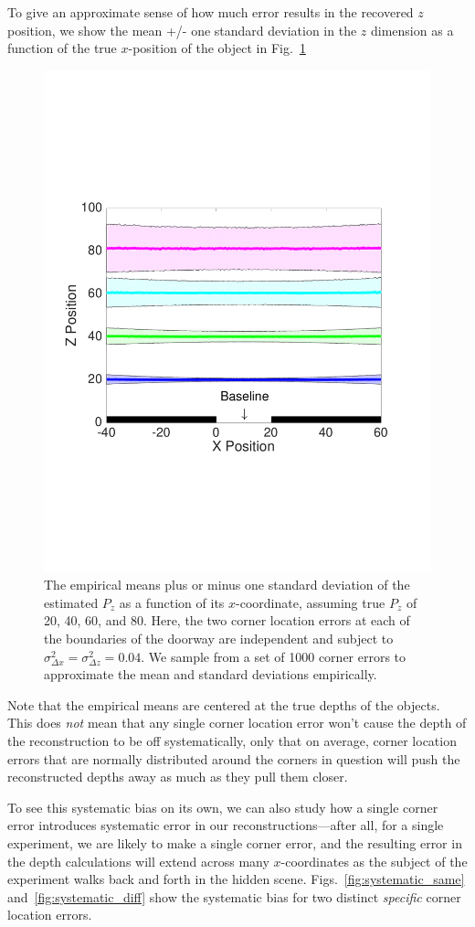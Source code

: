 \documentclass[11pt]{article}
\begin{document}
To give an approximate sense of how much error results in the recovered $z$ position, we show the mean +/- one standard deviation in the $z$ dimension as a function of the true $x$-position of the object in Fig.~\ref{fig:depth_plots}

\begin{figure}
\centering
\includegraphics[width=0.7\linewidth]{figs/depth_plots.pdf}
\caption{The empirical means plus or minus one standard deviation of the estimated $P_z$ as a function of its $x$-coordinate, assuming true $P_z$ of 20, 40, 60, and 80. Here, the two corner location errors at each of the boundaries of the doorway are independent and subject to $\sigma_{\Delta x}^2 = \sigma_{\Delta z}^2 = 0.04$. We sample from a set of 1000 corner errors to approximate the mean and standard deviations empirically. \label{fig:depth_plots}}
\end{figure}

Note that the empirical means are centered at the true depths of the objects. This does \emph{not} mean that any single corner location error won't cause the depth of the reconstruction to be off systematically, only that on average, corner location errors that are normally distributed around the corners in question will push the reconstructed depths away as much as they pull them closer.

To see this systematic bias on its own, we can also study how a single corner error introduces systematic error in our reconstructions---after all, for a single experiment, we are likely to make a single corner error, and the resulting error in the depth calculations will extend across many $x$-coordinates as the subject of the experiment walks back and forth in the hidden scene. Figs.~\ref{fig:systematic_same} and~\ref{fig:systematic_diff} show the systematic bias for two distinct \emph{specific} corner location errors.
\end{document}
